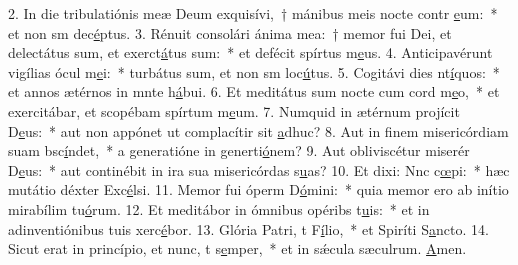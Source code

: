 2. In die tribulatiónis meæ Deum exquisívi,~† mánibus meis nocte contr \uline{e}um:~* et non sm dec\uline{é}ptus.
3. Rénuit consolári ánima mea:~† memor fui Dei, et delectátus sum, et exerct\uline{á}tus sum:~* et defécit spírtus m\uline{e}us.
4. Anticipavérunt vigílias ócul m\uline{e}i:~* turbátus sum, et non sm loc\uline{ú}tus.
5. Cogitávi dies nt\uline{í}quos:~* et annos ætérnos in mnte h\uline{á}bui.
6. Et meditátus sum nocte cum cord m\uline{e}o,~* et exercitábar, et scopébam spírtum m\uline{e}um.
7. Numquid in ætérnum projícit D\uline{e}us:~* aut non appónet ut complacítir sit \uline{a}dhuc?
8. Aut in finem misericórdiam suam bsc\uline{í}ndet,~* a generatióne in generti\uline{ó}nem?
9. Aut obliviscétur miserér D\uline{e}us:~* aut continébit in ira sua misericórdas s\uline{u}as?
10. Et dixi: Nnc c\uline{œ}pi:~* hæc mutátio déxter Exc\uline{é}lsi.
11. Memor fui óperm D\uline{ó}mini:~* quia memor ero ab inítio mirabílim tu\uline{ó}rum.
12. Et meditábor in ómnibus opéribs t\uline{u}is:~* et in adinventiónibus tuis xerc\uline{é}bor.
13. Glória Patri, t F\uline{í}lio,~* et Spiríti S\uline{a}ncto.
14. Sicut erat in princípio, et nunc, t s\uline{e}mper,~* et in sǽcula sæculrum. \uline{A}men.
